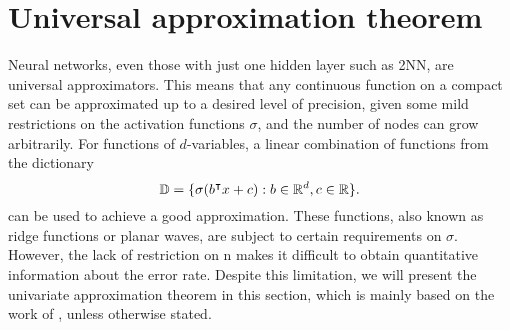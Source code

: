 
\section{Universal approximation theorem}
\label{sec:uat}

Neural networks, even those with just one hidden layer such as 2NN, are
universal approximators. This means that any continuous function on a compact
set can be approximated up to a desired level of precision, given some mild
restrictions on the activation functions $\sigma$, and the number of nodes can
grow arbitrarily. For functions of $d$-variables, a linear combination of
functions from the dictionary
\begin{equation}
    \label{eq:uat_dict}
    \mathbb{D} = \{\sigma(b{}^{\intercal} x + c): b \in \mathbb{R}^d, c\in \mathbb{R} \}.
\end{equation}
can be used to achieve a good approximation. These functions, also known as
ridge functions or planar waves, are subject to certain requirements on
$\sigma$. However, the lack of restriction on n makes it difficult to obtain
quantitative information about the error rate. Despite this limitation, we will
present the univariate approximation theorem in this section, which is mainly
based on the work of \cite{cybenkoApproximationSuperpositionsSigmoidal1989},
unless otherwise stated.


